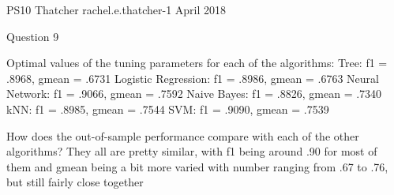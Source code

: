 PS10 Thatcher
rachel.e.thatcher-1
April 2018

Question 9

Optimal values of the tuning parameters for each of the algorithms:
Tree: f1 = .8968, gmean = .6731
Logistic Regression: f1 = .8986, gmean = .6763
Neural Network: f1 = .9066, gmean = .7592
Naive Bayes: f1 = .8826, gmean = .7340
kNN: f1 = .8985, gmean = .7544
SVM: f1 = .9090, gmean = .7539

How does the out-of-sample performance compare with each of the other
algorithms?
	They all are pretty similar, with f1 being around .90 for most of them and
	gmean being a bit more varied with number ranging from .67 to .76, but still
	fairly close together